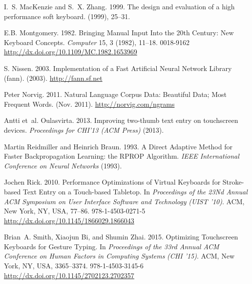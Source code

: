 \documentclass[final,1p,times,authoryear]{elsarticle}
\begin{document}
\begin{thebibliography}{00}
{I.~S. MacKenzie} {and} {S.~X. Zhang}. 1999.
The design and evaluation of a high performance
  soft keyboard.
(1999), 25--31.
\newblock


{E.B. Montgomery}. 1982.
Bringing Manual Input Into the 20th Century: New
  Keyboard Concepts.
{\em Computer\/} {15}, 3 (1982), 11--18.
0018-9162
\url{http://dx.doi.org/10.1109/MC.1982.1653969}


{S. Nissen}. 2003.
Implementation of a Fast Artificial Neural Network
  Library (fann).
(2003).
\url{http://fann.sf.net}


{Peter Norvig}. 2011.
Natural Language Corpus Data: Beautiful Data; Most
  Frequent Words.
(Nov. 2011).
\url{http://norvig.com/ngrams}


{Antti et~al. Oulasvirta}. 2013.
Improving two-thumb text entry on touchscreen
  devices.
{\em Proceedings for CHI'13 (ACM Press)\/} (2013).
\newblock


{Martin Reidmiller} {and} {Heinrich Braun}. 1993.
A Direct Adaptive Method for Faster Backpropagation
  Learning: the RPROP Algorithm.
{\em IEEE International Conference on Neural Networks\/} (1993).
\newblock


{Jochen Rick}. 2010.
Performance Optimizations of Virtual Keyboards for
  Stroke-based Text Entry on a Touch-based Tabletop. In {\em Proceedings of
  the 23Nd Annual ACM Symposium on User Interface Software and Technology} {\em
  (UIST '10)}. ACM, New York, NY, USA, 77--86.
978-1-4503-0271-5
\url{http://dx.doi.org/10.1145/1866029.1866043}


{Brian~A. Smith}, {Xiaojun Bi}, {and} {Shumin Zhai}. 2015.
Optimizing Touchscreen Keyboards for Gesture
  Typing. In {\em Proceedings of the 33rd Annual ACM Conference on Human
  Factors in Computing Systems} {\em (CHI '15)}. ACM, New York, NY, USA,
  3365--3374.
978-1-4503-3145-6
\url{http://dx.doi.org/10.1145/2702123.2702357}



\end{thebibliography}
\end{document}
